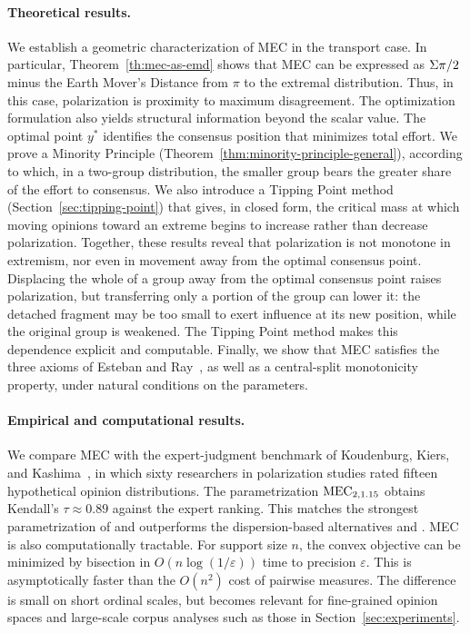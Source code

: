 \paragraph{Theoretical results.}
We establish a geometric characterization of MEC in the transport
case. In particular, Theorem~\ref{th:mec-as-emd} shows that MEC can be
expressed as \(\Sigma \pi/2\) minus the Earth Mover's Distance from
\(\pi\) to the extremal distribution. Thus, in this case,
polarization is proximity to maximum disagreement. The optimization
formulation also yields structural information beyond the scalar
value. The optimal point \(y^*\) identifies the consensus position that
minimizes total effort. We prove a Minority Principle
(Theorem~\ref{thm:minority-principle-general}), according to which, in
a two-group distribution, the smaller group bears the greater share of
the effort to consensus. We also introduce a Tipping Point method
(Section~\ref{sec:tipping-point}) that gives, in closed form, the
critical mass at which moving opinions toward an extreme begins to
increase rather than decrease polarization. Together, these results
reveal that polarization is not monotone in extremism, nor even in
movement away from the optimal consensus point. Displacing the whole
of a group away from the optimal consensus point raises polarization,
but transferring only a portion of the group can lower it: the detached
fragment may be too small to exert influence at its new position,
while the original group is weakened. The Tipping Point method
makes this dependence explicit and computable. Finally,
we show that MEC
satisfies the three axioms of Esteban and Ray~\cite{esteban1994measurement},
as well as a central-split monotonicity property, under natural
conditions on the parameters.

\paragraph{Empirical and computational results.}
We compare MEC with the expert-judgment benchmark of Koudenburg,
Kiers, and Kashima~\cite{koudenburg2021new}, in which sixty researchers in
polarization studies rated fifteen hypothetical opinion distributions.
The parametrization \(\MEC[2,1.15]\) obtains Kendall's
\(\tau\approx 0.89\) against the expert ranking. This matches the
strongest parametrization of \ERLabel{} and outperforms
the dispersion-based alternatives \VdELabel{} and
\TWDLabel. MEC is also computationally
tractable. For support size \(n\), the convex objective can be
minimized by bisection in \(O(n\log(1/\varepsilon))\) time to precision
\(\varepsilon\). This is asymptotically faster than the \(O(n^2)\)
cost of pairwise measures. The difference is small on short ordinal
scales, but becomes relevant for fine-grained opinion spaces and
large-scale corpus analyses such as those in
Section~\ref{sec:experiments}.


